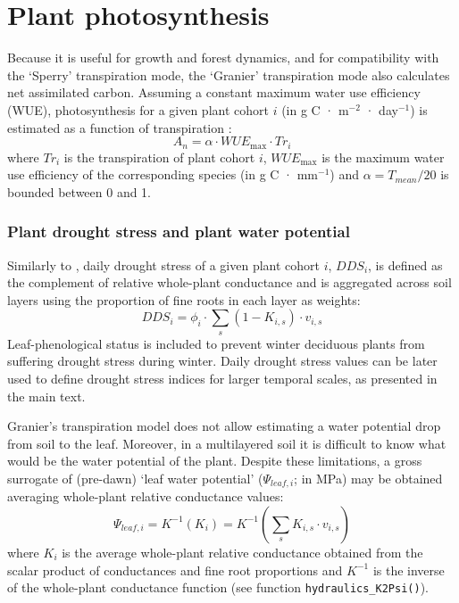 \documentclass[]{book}
\begin{document}
\hypertarget{plant-photosynthesis}{%
\section{Plant photosynthesis}\label{plant-photosynthesis}}

Because it is useful for growth and forest dynamics, and for compatibility with
the `Sperry' transpiration mode, the `Granier' transpiration mode also calculates
net assimilated carbon. Assuming a constant maximum water use efficiency (WUE),
photosynthesis for a given plant cohort \(i\) (in g C · m\(^{-2}\) · day\(^{-1}\)) is
estimated as a function of transpiration \citep{Mouillot2001}:
\begin{equation}
A_n = \alpha \cdot WUE_{\max} \cdot Tr_i
\end{equation}
where \(Tr_i\) is the transpiration of plant cohort \(i\), \(WUE_{\max}\) is the
maximum water use efficiency of the corresponding species (in g C · mm\(^{-1}\))
and \(\alpha = T_{mean}/20\) is bounded between 0 and 1.

\subsubsection{Plant drought stress and plant water potential}

Similarly to \citet{Mouillot2002}, daily drought stress of a given plant cohort
\(i\), \(DDS_i\), is defined as the complement of relative whole-plant conductance and
is aggregated across soil layers using the proportion of fine roots in each layer
as weights:
\begin{equation}
DDS_i=\phi_i \cdot \sum_{s}{(1-K_{i,s})\cdot v_{i,s}}
\end{equation}
Leaf-phenological status is included to prevent winter deciduous plants from
suffering drought stress during winter. Daily drought stress values can be later
used to define drought stress indices for larger temporal scales, as presented in
the main text.

Granier's transpiration model does not allow estimating a water potential drop
from soil to the leaf. Moreover, in a multilayered soil it is difficult to know
what would be the water potential of the plant. Despite these limitations, a
gross surrogate of (pre-dawn) `leaf water potential' (\(\Psi_{leaf,i}\); in MPa) may be
obtained averaging whole-plant relative conductance values:
\begin{equation}
\Psi_{leaf,i}=K^{-1}(K_i) = K^{-1}\left(\sum_{s}{K_{i,s}\cdot v_{i,s}}\right)
\end{equation}
where \(K_i\) is the average whole-plant relative conductance obtained from the
scalar product of conductances and fine root proportions and \(K^{-1}\) is the inverse of the whole-plant conductance function (see function \texttt{hydraulics\_K2Psi()}).
\end{document}
